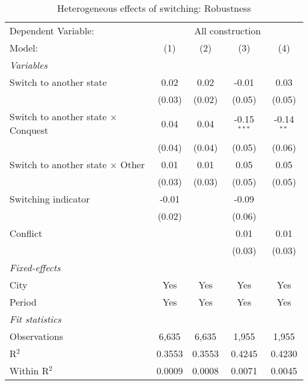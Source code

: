 \begin{table}[htbp]
   \caption{\label{tab:controls_50y} Heterogeneous effects of switching: Robustness}
   \centering
   \begin{tabular}{lcccc}
      \tabularnewline \midrule \midrule
      Dependent Variable: & \multicolumn{4}{c}{All construction}\\
      Model:                                     & (1)    & (2)    & (3)           & (4)\\  
      \midrule
      \emph{Variables}\\
      Switch to another state                    & 0.02   & 0.02   & -0.01         & 0.03\\   
                                                 & (0.03) & (0.02) & (0.05)        & (0.05)\\   
      Switch to another state $\times$ Conquest  & 0.04   & 0.04   & -0.15$^{***}$ & -0.14$^{**}$\\   
                                                 & (0.04) & (0.04) & (0.05)        & (0.06)\\   
      Switch to another state $\times$ Other     & 0.01   & 0.01   & 0.05          & 0.05\\   
                                                 & (0.03) & (0.03) & (0.05)        & (0.05)\\   
      Switching indicator                        & -0.01  &        & -0.09         &   \\   
                                                 & (0.02) &        & (0.06)        &   \\   
      Conflict                                   &        &        & 0.01          & 0.01\\   
                                                 &        &        & (0.03)        & (0.03)\\   
      \midrule
      \emph{Fixed-effects}\\
      City                                       & Yes    & Yes    & Yes           & Yes\\  
      Period                                     & Yes    & Yes    & Yes           & Yes\\  
      \midrule
      \emph{Fit statistics}\\
      Observations                               & 6,635  & 6,635  & 1,955         & 1,955\\  
      R$^2$                                      & 0.3553 & 0.3553 & 0.4245        & 0.4230\\  
      Within R$^2$                               & 0.0009 & 0.0008 & 0.0071        & 0.0045\\  
      \midrule \midrule
      

\end{tabular}
\end{table}
